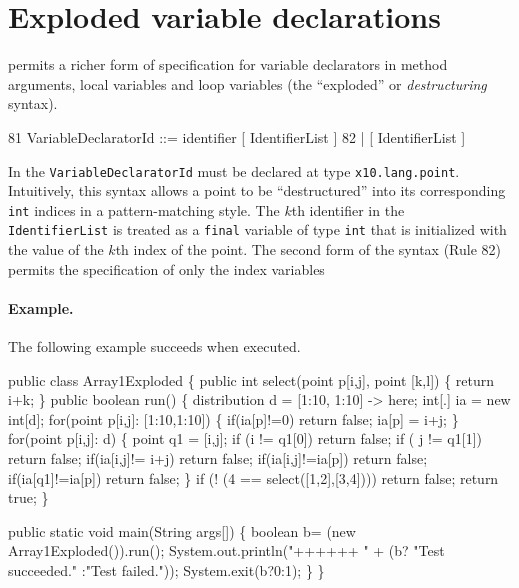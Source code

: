 \section{Exploded variable declarations}\label{exploded-syntax}

\Xten{} permits a richer form of specification for variable
declarators in method arguments, local variables and loop variables
(the ``exploded'' or {\em destructuring} syntax).
\begin{x10}
81    VariableDeclaratorId ::= 
           identifier [ IdentifierList ]
82       | [ IdentifierList ]
\end{x10}
In \XtenCurrVer{} the {\tt VariableDeclaratorId} must be declared at
type {\tt x10.lang.point}. Intuitively, this syntax allows a
point to be ``destructured'' into its corresponding {\tt int} 
indices in a pattern-matching style.
The $k$th identifier in the {\tt
IdentifierList} is treated as a {\tt final} variable of type {\tt int}
that is initialized with the value of the $k$th index of the point. 
The second form of the syntax (Rule 82) permits the specification of only
the index variables

\paragraph{Example.}
The following example succeeds when executed.
\begin{x10}
public class Array1Exploded \{
  public int select(point p[i,j], point [k,l]) \{
      return i+k;
  \}
  public boolean run() \{
    distribution d =  [1:10, 1:10] -> here;
    int[.] ia = new int[d];
    for(point p[i,j]: [1:10,1:10]) \{
        if(ia[p]!=0) return false;
        ia[p] = i+j;
    \}
    for(point p[i,j]: d) \{
      point q1 = [i,j];
      if (i != q1[0]) return false;
      if ( j != q1[1]) return false;
      if(ia[i,j]!= i+j) return false;
      if(ia[i,j]!=ia[p]) return false;
      if(ia[q1]!=ia[p]) return false;
   \}
    if (! (4 == select([1,2],[3,4]))) return false;
     return true;
   \}
        
  public static void main(String args[]) \{
     boolean b= (new Array1Exploded()).run();
     System.out.println("++++++ "
                        + (b? "Test succeeded."
                           :"Test failed."));
     System.exit(b?0:1);
 \}
\}
\end{x10}

 \par  %




